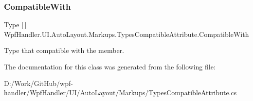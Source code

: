 \subsubsection{\texorpdfstring{Compatible\+With}{CompatibleWith}}
{\footnotesize\ttfamily Type \mbox{[}$\,$\mbox{]} Wpf\+Handler.\+U\+I.\+Auto\+Layout.\+Markups.\+Types\+Compatible\+Attribute.\+Compatible\+With}



Type that compatible with the member. 



The documentation for this class was generated from the following file\+:\begin{DoxyCompactItemize}
\item 
D\+:/\+Work/\+Git\+Hub/wpf-\/handler/\+Wpf\+Handler/\+U\+I/\+Auto\+Layout/\+Markups/Types\+Compatible\+Attribute.\+cs\end{DoxyCompactItemize}
